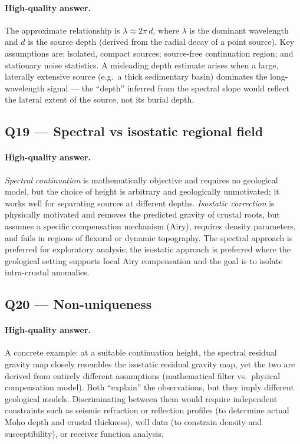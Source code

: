 \documentclass[11pt]{article}
\begin{document}
\paragraph{High-quality answer.}
The approximate relationship is $\lambda \approx 2\pi\,d$, where $\lambda$ is the
dominant wavelength and $d$ is the source depth (derived from the radial decay of
a point source).  Key assumptions are: isolated, compact sources; source-free
continuation region; and stationary noise statistics.  A misleading depth estimate
arises when a large, laterally extensive source (e.g.\ a thick sedimentary basin)
dominates the long-wavelength signal — the ``depth'' inferred from the spectral
slope would reflect the lateral extent of the source, not its burial depth.

\subsection*{Q19 — Spectral vs isostatic regional field}

\paragraph{High-quality answer.}
\emph{Spectral continuation} is mathematically objective and requires no
geological model, but the choice of height is arbitrary and geologically
unmotivated; it works well for separating sources at different depths.
\emph{Isostatic correction} is physically motivated and removes the predicted
gravity of crustal roots, but assumes a specific compensation mechanism (Airy),
requires density parameters, and fails in regions of flexural or dynamic
topography.  The spectral approach is preferred for exploratory analysis; the
isostatic approach is preferred where the geological setting supports local Airy
compensation and the goal is to isolate intra-crustal anomalies.

\subsection*{Q20 — Non-uniqueness}

\paragraph{High-quality answer.}
A concrete example: at a suitable continuation height, the spectral residual
gravity map closely resembles the isostatic residual gravity map, yet the two
are derived from entirely different assumptions (mathematical filter vs.\
physical compensation model).  Both ``explain'' the observations, but they imply
different geological models.  Discriminating between them would require
independent constraints such as seismic refraction or reflection profiles (to
determine actual Moho depth and crustal thickness), well data (to constrain
density and susceptibility), or receiver function analysis.
\end{document}
